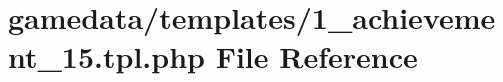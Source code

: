 \hypertarget{1__achievement__15_8tpl_8php}{\section{gamedata/templates/1\+\_\+achievement\+\_\+15.tpl.\+php File Reference}
\label{1__achievement__15_8tpl_8php}
}
